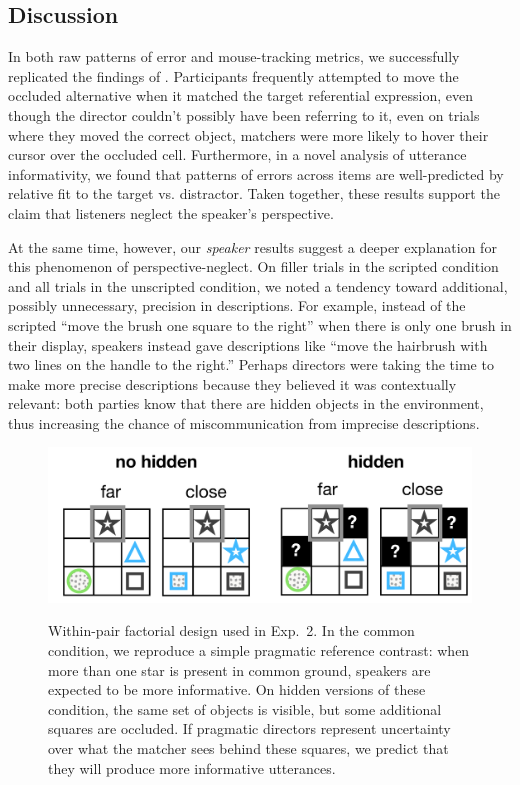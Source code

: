 \documentclass[manuscript]{stjour}
\begin{document}
\subsection{Discussion}

In both raw patterns of error and mouse-tracking metrics, we successfully replicated the findings of \cite{KeysarLinBarr03_LimitsOnTheoryOfMindUse}. Participants frequently attempted to move the occluded alternative when it matched the target referential expression, even though the director couldn't possibly have been referring to it, even on trials where they moved the correct object, matchers were more likely to hover their cursor over the occluded cell. Furthermore, in a novel analysis of utterance informativity, we found that patterns of errors across items are well-predicted by relative fit to the target vs. distractor. Taken together, these results support the claim that listeners neglect the speaker's perspective. 

At the same time, however, our \emph{speaker} results suggest a deeper explanation for this phenomenon of perspective-neglect. On filler trials in the scripted condition and all trials in the unscripted condition, we noted a tendency toward additional, possibly unnecessary, precision in descriptions. For example, instead of the scripted ``move the brush one square to the right'' when there is only one brush in their display, speakers instead gave descriptions like ``move the hairbrush with two lines on the handle to the right.'' 
Perhaps directors were taking the time to make more precise descriptions because they believed it was contextually relevant: both parties know that there are hidden objects in the environment, thus increasing the chance of miscommunication from imprecise descriptions. 

  \begin{figure}[t!]
 \begin{center}
 \vspace{-.5cm}
 \includegraphics[scale=.25]{figures/Exp2_design}
 \caption{Within-pair factorial design used in Exp.~2. In the common condition, we reproduce a simple pragmatic reference contrast: when more than one star is present in common ground, speakers are expected to be more informative. On hidden versions of these condition, the same set of objects is visible, but some additional squares are occluded. If pragmatic directors represent uncertainty over what the matcher sees behind these squares, we predict that they will produce more informative utterances.}
 \vspace{-.5cm}
 \label{fig:exp2design}
 \end{center}
 \end{figure}
\end{document}
